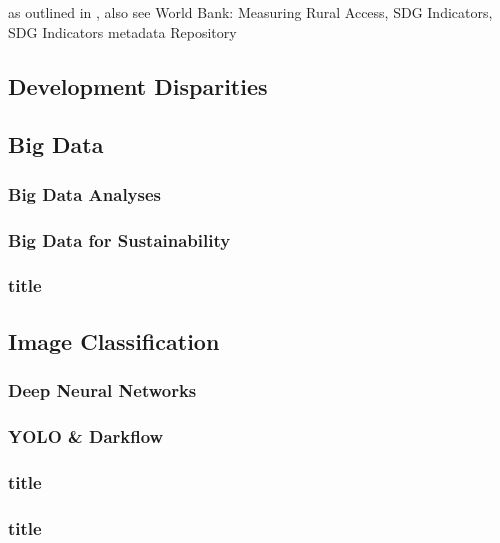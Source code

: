 	            \medskip

                as outlined in \cite{sdsn2015}, also see World Bank: Measuring Rural Access, SDG Indicators, SDG Indicators metadata Repository
	            
	            \medskip
	            
		
		
		\subsection{Development Disparities}
		
		
		
		\subsection{Big Data}
			\subsubsection{Big Data Analyses}
			
			\subsubsection{Big Data for Sustainability}
			
			\subsubsection{title}
			
			
			
		\subsection{Image Classification}
			\subsubsection{Deep Neural Networks}
			
			\subsubsection{YOLO \& Darkflow}
			
			\subsubsection{title}
			
			\subsubsection{title}
			
